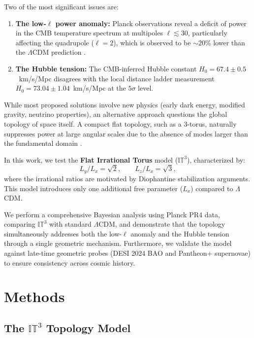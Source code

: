 \documentclass[a4paper,11pt]{article}
\begin{document}
Two of the most significant issues are:
\begin{enumerate}
    \item \textbf{The low-$\ell$ power anomaly:} Planck observations reveal a deficit of power in the CMB temperature spectrum at multipoles $\ell \lesssim 30$, particularly affecting the quadrupole ($\ell=2$), which is observed to be $\sim 20\%$ lower than the $\Lambda$CDM prediction \citep{Planck2015_anomalies}.
    
    \item \textbf{The Hubble tension:} The CMB-inferred Hubble constant $H_0 = 67.4 \pm 0.5$~km/s/Mpc \citep{Planck2018} disagrees with the local distance ladder measurement $H_0 = 73.04 \pm 1.04$~km/s/Mpc \citep{SH0ES2024} at the $5\sigma$ level.
\end{enumerate}

While most proposed solutions involve new physics (early dark energy, modified gravity, neutrino properties), an alternative approach questions the global topology of space itself. A compact flat topology, such as a 3-torus, naturally suppresses power at large angular scales due to the absence of modes larger than the fundamental domain \citep{Luminet2008,Weeks2001}.

In this work, we test the \textbf{Flat Irrational Torus} model ($\mathbb{IT}^3$), characterized by:
\begin{equation}
    L_y/L_x = \sqrt{2}, \qquad L_z/L_x = \sqrt{3},
\end{equation}
where the irrational ratios are motivated by Diophantine stabilization arguments. This model introduces only one additional free parameter ($L_x$) compared to $\Lambda$CDM.

We perform a comprehensive Bayesian analysis using Planck PR4 data, comparing $\mathbb{IT}^3$ with standard $\Lambda$CDM, and demonstrate that the topology simultaneously addresses both the low-$\ell$ anomaly and the Hubble tension through a single geometric mechanism. Furthermore, we validate the model against late-time geometric probes (DESI 2024 BAO and Pantheon+ supernovae) to ensure consistency across cosmic history.

\section{Methods}

\subsection{The $\mathbb{IT}^3$ Topology Model}
\end{document}
